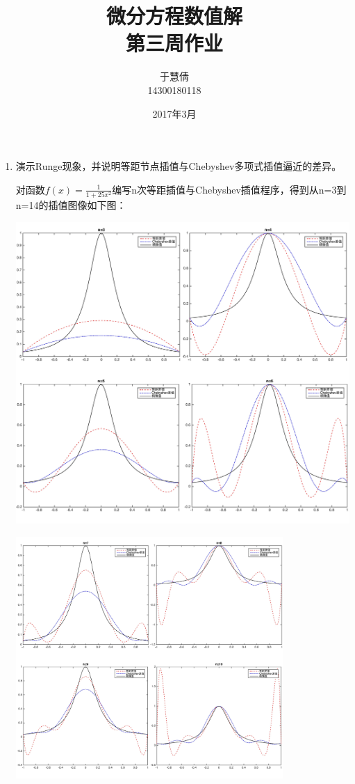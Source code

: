 \documentclass{ctexart}
\title{微分方程数值解 \\ 第三周作业}
\author{于慧倩 \\ 14300180118}
\date{2017年3月}
\begin{document}
\maketitle

\newpage

\begin{enumerate}

\item 演示Runge现象，并说明等距节点插值与Chebyshev多项式插值逼近的差异。


对函数\(f(x)= \displaystyle \frac{1}{1+25x^2}\)编写n次等距插值与Chebyshev插值程序，得到从n=3到n=14的插值图像如下图：

\centerline{\includegraphics[width=5.5in]{1.jpg}}

\centerline{\includegraphics[width=4in]{2.jpg}}


\end{enumerate}
\end{document}

